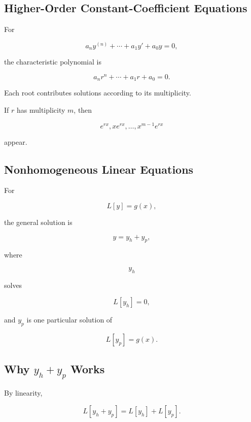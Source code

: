 \subsection{Higher-Order Constant-Coefficient Equations}
\label{subsec:higher-order-constant-coefficient}

For

\[
\boxed{
a_ny^{(n)}
+
\cdots
+
a_1y'
+
a_0y
=
0,
}
\]

the characteristic polynomial is

\[
\boxed{
a_nr^n
+
\cdots
+
a_1r
+
a_0
=
0.
}
\]

Each root contributes solutions according to its multiplicity.

If \(r\) has multiplicity \(m\), then

\[
\boxed{
e^{rx},
xe^{rx},
\ldots,
x^{m-1}e^{rx}
}
\]

appear.

\subsection{Nonhomogeneous Linear Equations}
\label{subsec:linear-nonhomogeneous-solution}

For

\[
\boxed{
L[y]
=
g(x),
}
\]

the general solution is

\[
\boxed{
y
=
y_h+y_p,
}
\]

where

\[
y_h
\]

solves

\[
L[y_h]=0,
\]

and \(y_p\) is one particular solution of

\[
L[y_p]=g(x).
\]

\subsection{Why \(y_h+y_p\) Works}
\label{subsec:why-homogeneous-plus-particular}

By linearity,

\[
L[y_h+y_p]
=
L[y_h]
+
L[y_p].
\]

